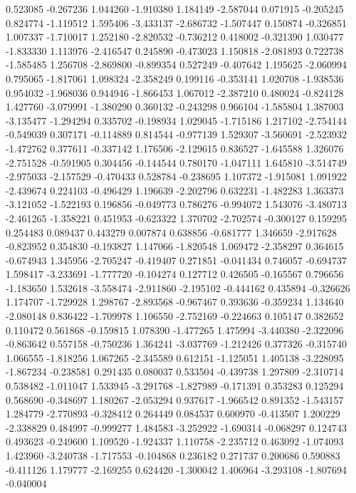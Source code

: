 0.523085
-0.267236
1.044260
-1.910380
1.184149
-2.587044
0.071915
-0.205245
0.824774
-1.119512
1.595406
-3.433137
-2.686732
-1.507447
0.150874
-0.326851
1.007337
-1.710017
1.252180
-2.820532
-0.736212
0.418002
-0.321390
1.030477
-1.833330
1.113976
-2.416547
0.245890
-0.473023
1.150818
-2.081893
0.722738
-1.585485
1.256708
-2.869800
-0.899354
0.527249
-0.407642
1.195625
-2.060994
0.795065
-1.817061
1.098324
-2.358249
0.199116
-0.353141
1.020708
-1.938536
0.954032
-1.968036
0.944946
-1.866453
1.067012
-2.387210
0.480024
-0.824128
1.427760
-3.079991
-1.380290
0.360132
-0.243298
0.966104
-1.585804
1.387003
-3.135477
-1.294294
0.335702
-0.198934
1.029045
-1.715186
1.217102
-2.754144
-0.549039
0.307171
-0.114889
0.814544
-0.977139
1.529307
-3.560691
-2.523932
-1.472762
0.377611
-0.337142
1.176506
-2.129615
0.836527
-1.645588
1.326076
-2.751528
-0.591905
0.304456
-0.144544
0.780170
-1.047111
1.645810
-3.514749
-2.975033
-2.157529
-0.470433
0.528784
-0.238695
1.107372
-1.915081
1.091922
-2.439674
0.224103
-0.496429
1.196639
-2.202796
0.632231
-1.482283
1.363373
-3.121052
-1.522193
0.196856
-0.049773
0.786276
-0.994072
1.543076
-3.480713
-2.461265
-1.358221
0.451953
-0.623322
1.370702
-2.702574
-0.300127
0.159295
0.254483
0.089437
0.443279
0.007874
0.638856
-0.681777
1.346659
-2.917628
-0.823952
0.354830
-0.193827
1.147066
-1.820548
1.069472
-2.358297
0.364615
-0.674943
1.345956
-2.705247
-0.419407
0.271851
-0.041434
0.746057
-0.694737
1.598417
-3.233691
-1.777720
-0.104274
0.127712
0.426505
-0.165567
0.796656
-1.183650
1.532618
-3.558474
-2.911860
-2.195102
-0.444162
0.435894
-0.326626
1.174707
-1.729928
1.298767
-2.893568
-0.967467
0.393636
-0.359234
1.134640
-2.080148
0.836422
-1.709978
1.106550
-2.752169
-0.224663
0.105147
0.382652
0.110472
0.561868
-0.159815
1.078390
-1.477265
1.475994
-3.440380
-2.322096
-0.863642
0.557158
-0.750236
1.364241
-3.037769
-1.212426
0.377326
-0.315740
1.066555
-1.818256
1.067265
-2.345589
0.612151
-1.125051
1.405138
-3.228095
-1.867234
-0.238581
0.291435
0.080037
0.533504
-0.439738
1.297809
-2.310714
0.538482
-1.011047
1.533945
-3.291768
-1.827989
-0.171391
0.353283
0.125294
0.568690
-0.348697
1.180267
-2.053294
0.937617
-1.966542
0.891352
-1.543157
1.284779
-2.770893
-0.328412
0.264449
0.084537
0.600970
-0.413507
1.200229
-2.338829
0.484997
-0.999277
1.484583
-3.252922
-1.690314
-0.068297
0.124743
0.493623
-0.249600
1.109520
-1.924337
1.110758
-2.235712
0.463092
-1.074093
1.423960
-3.240738
-1.717553
-0.104868
0.236182
0.271737
0.200686
0.590883
-0.411126
1.179777
-2.169255
0.624420
-1.300042
1.406964
-3.293108
-1.807694
-0.040004
